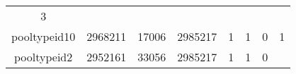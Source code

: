 \documentclass[]{book}
\theoremstyle{definition}
\theoremstyle{definition}
\theoremstyle{definition}
\theoremstyle{remark}
\begin{document}
\begin{longtable}[]{@{}cccccccc@{}}
\begin{minipage}[t]{0.09\columnwidth}
3\strut
\end{minipage}\tabularnewline
\begin{minipage}[t]{0.23\columnwidth}\centering\strut
pooltypeid10\strut
\end{minipage} & \begin{minipage}[t]{0.09\columnwidth}\centering\strut
2968211\strut
\end{minipage} & \begin{minipage}[t]{0.10\columnwidth}\centering\strut
17006\strut
\end{minipage} & \begin{minipage}[t]{0.09\columnwidth}\centering\strut
2985217\strut
\end{minipage} & \begin{minipage}[t]{0.05\columnwidth}\centering\strut
1\strut
\end{minipage} & \begin{minipage}[t]{0.05\columnwidth}\centering\strut
1\strut
\end{minipage} & \begin{minipage}[t]{0.07\columnwidth}\centering\strut
0\strut
\end{minipage} & \begin{minipage}[t]{0.09\columnwidth}\centering\strut
1\strut
\end{minipage}\tabularnewline
\begin{minipage}[t]{0.23\columnwidth}\centering\strut
pooltypeid2\strut
\end{minipage} & \begin{minipage}[t]{0.09\columnwidth}\centering\strut
2952161\strut
\end{minipage} & \begin{minipage}[t]{0.10\columnwidth}\centering\strut
33056\strut
\end{minipage} & \begin{minipage}[t]{0.09\columnwidth}\centering\strut
2985217\strut
\end{minipage} & \begin{minipage}[t]{0.05\columnwidth}\centering\strut
1\strut
\end{minipage} & \begin{minipage}[t]{0.05\columnwidth}\centering\strut
1\strut
\end{minipage} & \begin{minipage}[t]{0.07\columnwidth}\centering\strut
0\strut
\end{minipage} & \begin{minipage}[t]{0.09\columnwidth}\centering\strut

\end{minipage}
\end{longtable}
\end{document}
